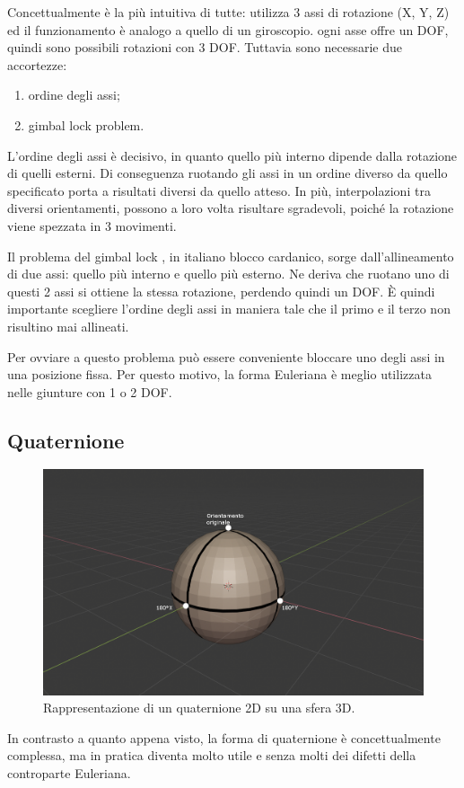 Concettualmente è la più intuitiva di tutte: utilizza 3 assi di rotazione (X, Y, Z) ed il funzionamento è analogo a quello di un giroscopio. ogni asse offre un DOF, quindi sono possibili rotazioni con 3 DOF. Tuttavia sono necessarie due accortezze: 
\begin{enumerate}
    \item ordine degli assi;
    \item gimbal lock problem.
\end{enumerate}
L'ordine degli assi è decisivo, in quanto quello più interno dipende dalla rotazione di quelli esterni. Di conseguenza ruotando gli assi in un ordine diverso da quello specificato porta a risultati diversi da quello atteso. In più, interpolazioni tra diversi orientamenti, possono a loro volta risultare sgradevoli, poiché la rotazione viene spezzata in 3 movimenti.

Il problema del gimbal lock \parencite{anticz16}, in italiano blocco cardanico, sorge dall'allineamento di due assi: quello più interno e quello più esterno. Ne deriva che ruotano uno di questi 2 assi si ottiene la stessa rotazione, perdendo quindi un DOF.
È quindi importante scegliere l'ordine degli assi in maniera tale che il primo e il terzo non risultino mai allineati.

Per ovviare a questo problema può essere conveniente bloccare uno degli assi in una posizione fissa. Per questo motivo, la forma Euleriana è meglio utilizzata nelle giunture con 1 o 2 DOF.

\subsection{Quaternione}
\begin{figure}[ht]
\centering
\includegraphics[width=.8\textwidth]{Figures/3d-sphere}
\decoRule
\caption[Quaternione 2D]{Rappresentazione di un quaternione 2D su una sfera 3D.}
\label{fig:quater}
\end{figure}
In contrasto a quanto appena visto, la forma di quaternione è concettualmente complessa, ma in pratica diventa molto utile e senza molti dei difetti della controparte Euleriana.

